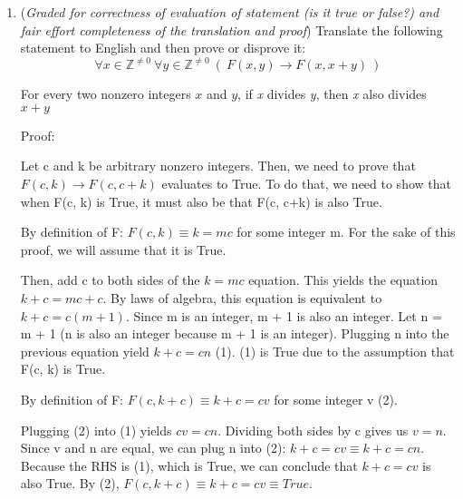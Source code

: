 \documentclass[12pt, oneside]{article}
\begin{document}
\begin{enumerate}
\begin{enumerate}
{completeness in justification})
Which of the statements (i) - (viii) is being {\bf disproved} by
the following proof?
\begin{quote}
To disprove the statement, we need to find a counterexample. We
choose $-1$, which is a nonzero
integer so in the domain. We need to show $ F(-1,1)$. By
definition of the predicate $F$, we
can rewrite this goal as $\exists c \in \mathbb{Z}~(1 = c \cdot
-1)$. We pick the {\bf witness} $c = -1$,
which is an integer and therefore in the domain. Plugging the
value of the witness $c$, we get
$c \cdot -1 = -1 \cdot -1 = 1$, as required. So the
counterexample works to
disprove the original statement.
\hfill $\blacksquare$
\end{quote}
{\it Hint: It may be useful to
identify the key words in the proof that indicate proof
strategies.}
\newline \textbf{(iv)}
\end{enumerate}
\item\label{predicate} ({\it Graded for correctness of evaluation
of statement (is it true or false?) and fair effort completeness
of the translation and proof}) Translate the following statement
to English and then prove or disprove it:
$$\forall x \in \mathbb{Z}^{\neq 0}~ \forall y \in \mathbb{Z}^{\neq 0} ~(~F(x,y) \to F(x,x+y)~)$$

For every two nonzero integers $x$ and $y$, if \textit{x} divides \textit{y}, then \textit{x} also divides $x+y$

Proof:

Let c and k be arbitrary nonzero integers. Then, we need to prove that 
$F(c, k) \to F(c, c+k)$ evaluates to True. To do that, we need to show that when F(c, k) is True, it must also be that F(c, c+k) is also True.

By definition of F: $F(c, k) \equiv k = mc$ for some integer m. For the sake of this proof, we will assume that it is True.

Then, add c to both sides of the $k = mc$ equation. This yields the equation $k + c = mc + c$. By laws of algebra, this equation is equivalent to $k + c = c(m + 1)$. Since m is an integer, m + 1 is also an integer. Let n = m + 1 (n is also an integer because m + 1 is an integer). Plugging n into the previous equation yield $k + c = cn$ (1). (1) is True due to the assumption that F(c, k) is True.

By definition of F: $F(c, k + c) \equiv k + c = cv$ for some integer v (2).

Plugging (2) into (1) yields $cv = cn$. Dividing both sides by c gives us $v = n$. Since v and n are equal, we can plug n into (2): $k + c = cv \equiv k + c = cn$. Because the RHS is (1), which is True, we can conclude that $k + c = cv$ is also True. By (2), $F(c, k + c) \equiv k + c = cv \equiv True$.


\end{enumerate}
\end{document}
